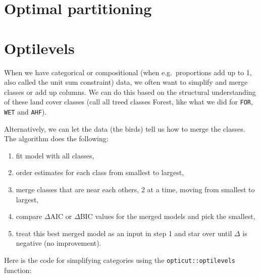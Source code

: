 \documentclass[12pt,]{book}
\newenvironment{Shaded}{\begin{snugshade}}{\end{snugshade}}
\newcommand{\DataTypeTok}[1]{\textcolor[rgb]{0.13,0.29,0.53}{#1}}
\newcommand{\DecValTok}[1]{\textcolor[rgb]{0.00,0.00,0.81}{#1}}
\newcommand{\KeywordTok}[1]{\textcolor[rgb]{0.13,0.29,0.53}{\textbf{#1}}}
\newcommand{\NormalTok}[1]{#1}
\newcommand{\OperatorTok}[1]{\textcolor[rgb]{0.81,0.36,0.00}{\textbf{#1}}}
\newcommand{\StringTok}[1]{\textcolor[rgb]{0.31,0.60,0.02}{#1}}
\providecommand{\tightlist}{%
  \setlength{\itemsep}{0pt}\setlength{\parskip}{0pt}}
\begin{document}
\hypertarget{optimal-partitioning}{%
\section{Optimal partitioning}\label{optimal-partitioning}}

\begin{Shaded}
\end{Shaded}

\hypertarget{optilevels}{%
\section{Optilevels}\label{optilevels}}

When we have categorical or compositional (when e.g.~proportions add up to 1, also called
the unit sum constraint) data,
we often want to simplify and merge classes or add up columns.
We can do this based on the structural understanding of these land cover classes
(call all treed classes Forest, like what we did for \texttt{FOR}, \texttt{WET} and \texttt{AHF}).

Alternatively, we can let the data (the birds) tell us how to merge the classes.
The algorithm does the following:

\begin{enumerate}
\def\labelenumi{\arabic{enumi}.}
\tightlist
\item
  fit model with all classes,
\item
  order estimates for each class from smallest to largest,
\item
  merge classes that are near each others, 2 at a time, moving from smallest to largest,
\item
  compare \(\Delta\)AIC or \(\Delta\)BIC values for the merged models and pick the smallest,
\item
  treat this best merged model as an input in step 1 and star over until \(\Delta\) is negative (no improvement).
\end{enumerate}

Here is the code for simplifying categories using the \texttt{opticut::optilevels} function:
\end{document}
